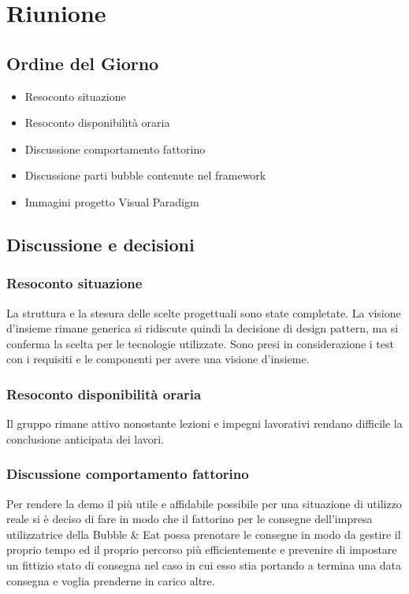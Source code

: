 \section{Riunione}
\subsection{Ordine del Giorno}
\begin{itemize}
	\item Resoconto situazione
	\item Resoconto disponibilità oraria
	\item Discussione comportamento fattorino
	\item Discussione parti bubble contenute nel framework 
	\item Immagini progetto Visual Paradigm
\end{itemize}

\subsection{Discussione e decisioni}

\subsubsection{Resoconto situazione}
La struttura e la stesura delle scelte progettuali sono state completate. La visione d'insieme rimane generica si ridiscute quindi la decisione di design pattern, ma si conferma la scelta per le tecnologie utilizzate. Sono presi in considerazione i test con i requisiti e le componenti per avere una visione d'insieme.

\subsubsection{Resoconto disponibilità oraria}
Il gruppo rimane attivo nonostante lezioni e impegni lavorativi rendano difficile la conclusione anticipata dei lavori.

\subsubsection{Discussione comportamento fattorino}
Per rendere la demo il più utile e affidabile possibile per una situazione di utilizzo reale si è deciso di fare in modo che il fattorino per le consegne dell'impresa utilizzatrice della Bubble \& Eat possa prenotare le consegne in modo da gestire il proprio tempo ed il proprio percorso più efficientemente e prevenire di impostare un fittizio stato di consegna nel caso in cui esso stia portando a termina una data consegna e voglia prenderne in carico altre. 

